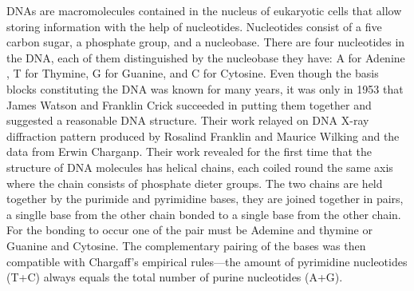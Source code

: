 DNAs are macromolecules contained in the nucleus of eukaryotic cells that allow storing information with the help of nucleotides.  Nucleotides consist of a five carbon sugar, a phosphate group, and a nucleobase. There are four nucleotides in the DNA, each of them distinguished by the nucleobase they have: A for Adenine , T for Thymine, G for Guanine, and C for Cytosine. Even though the basis blocks constituting the DNA was known for many years, it was only in 1953 that James Watson and Franklin Crick succeeded in putting them together and suggested a reasonable DNA structure. Their work relayed on DNA X-ray diffraction pattern produced by Rosalind Franklin and Maurice Wilking and the data from Erwin Charganp. Their work revealed for the first time that the structure of DNA molecules has helical chains, each coiled round the same axis where the chain consists of phosphate dieter groups. The two chains are held together by the purimide and pyrimidine bases, they are joined together in pairs, a singlle base from the other chain bonded to a single base from the other chain. For the bonding to occur one of the pair must be Ademine and thymine or Guanine and Cytosine. The complementary pairing of the bases was then compatible with Chargaff's empirical rules---the amount of pyrimidine nucleotides (T+C) always equals the total number of purine nucleotides (A+G). 

